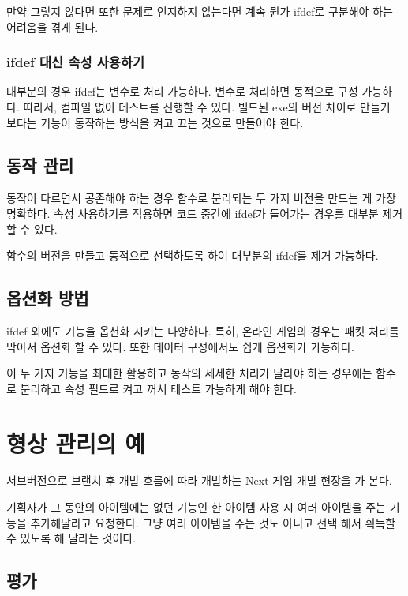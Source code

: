 \documentclass[chapter,kosection, 10.5pt, romanfixed, a4paper]{oblivoir}
\begin{document}
만약 그렇지 않다면 또한 문제로 인지하지 않는다면 계속 뭔가 ifdef로 구분해야 하는 
어려움을 겪게 된다. 

\subsubsection{ifdef 대신 속성 사용하기}

대부분의 경우 ifdef는 변수로 처리 가능하다. 변수로 처리하면 동적으로 구성 가능하다. 따라서, 
컴파일 없이 테스트를 진행할 수 있다. 빌드된 exe의 버전 차이로 만들기 보다는 기능이 동작하는
방식을 켜고 끄는 것으로 만들어야 한다. 

\subsection{동작 관리}

동작이 다르면서 공존해야 하는 경우 함수로 분리되는 두 가지 버전을 만드는 게 가장 명확하다. 
속성 사용하기를 적용하면 코드 중간에 ifdef가 들어가는 경우를 대부분 제거할 수 있다. 

함수의 버전을 만들고 동적으로 선택하도록 하여 대부분의 ifdef를 제거 가능하다. 

\subsection{옵션화 방법}

ifdef 외에도 기능을 옵션화 시키는 다양하다. 특히, 온라인 게임의 경우는 패킷 처리를 
막아서 옵션화 할 수 있다. 또한 데이터 구성에서도 쉽게 옵션화가 가능하다. 

이 두 가지 기능을 최대한 활용하고 동작의 세세한 처리가 달라야 하는 경우에는 함수로 
분리하고 속성 필드로 켜고 꺼서 테스트 가능하게 해야 한다. 

\section{형상 관리의 예}

서브버전으로 브랜치 후 개발 흐름에 따라 개발하는 Next 게임 개발 현장을 가 본다. 

기획자가 그 동안의 아이템에는 없던 기능인 한 아이템 사용 시 여러 아이템을 주는 
기능을 추가해달라고 요청한다. 그냥 여러 아이템을 주는 것도 아니고 선택 해서 
획득할 수 있도록 해 달라는 것이다. 

\subsection{평가}
\end{document}
